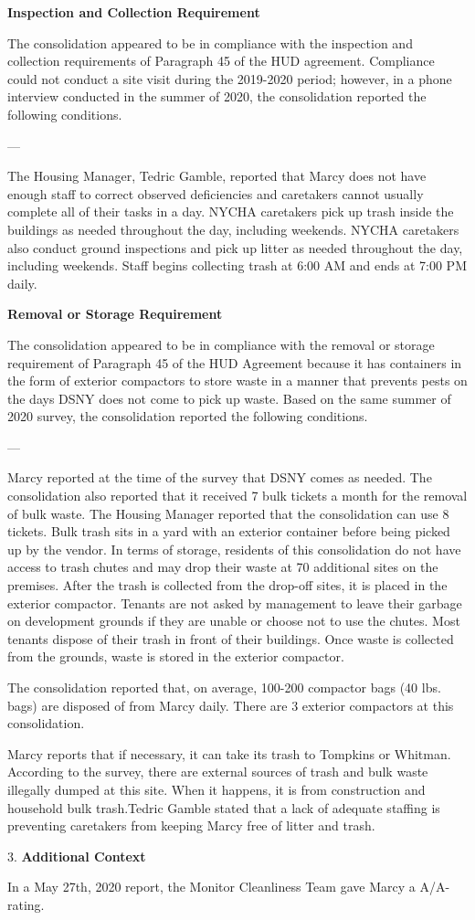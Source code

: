 

\textbf{Inspection and Collection Requirement}

The consolidation appeared to be in compliance with the inspection and collection requirements of Paragraph 45 of the HUD agreement. Compliance could not conduct a site visit during the 2019-2020 period; however, in a phone interview conducted in the summer of 2020, the consolidation reported the following conditions.

---

The Housing Manager, Tedric Gamble, reported that Marcy does not have enough staff to correct observed deficiencies and caretakers cannot usually complete all of their tasks in a day. NYCHA caretakers pick up trash inside the buildings as needed throughout the day, including weekends. NYCHA caretakers also conduct ground inspections and pick up litter as needed throughout the day, including weekends. Staff begins collecting trash at 6:00 AM and ends at 7:00 PM daily.

\textbf{Removal or Storage Requirement}

The consolidation appeared to be in compliance with the  removal or storage requirement of Paragraph  45 of the HUD Agreement because it has containers in the form of exterior compactors to store waste in a manner that prevents pests on the days DSNY does not come to pick up waste. Based on the same summer of  2020 survey, the consolidation reported the following conditions.

---

Marcy reported at the time of the survey that DSNY comes as needed. The consolidation also reported that it received 7 bulk tickets a month for the removal of bulk waste. The Housing Manager reported that the consolidation can use 8 tickets. Bulk trash sits in a yard with an exterior container before being picked up by the vendor. In terms of storage, residents of this consolidation do not have access to trash chutes and may drop their waste at 70 additional sites on the premises. After the trash is collected from the drop-off sites, it is placed in the exterior compactor. Tenants are not asked by management to leave their garbage on development grounds if they are unable or choose not to use the chutes. Most tenants dispose of their trash in front of their buildings. Once waste is collected from the grounds, waste is stored in the exterior compactor. 

The consolidation reported that, on average, 100-200 compactor bags (40 lbs. bags) are disposed of from Marcy daily. There are 3 exterior compactors at this consolidation.

Marcy reports that if necessary, it can take its trash to Tompkins or Whitman. According to the survey, there are external sources of trash and bulk waste illegally dumped at this site. When it happens, it is from construction and household bulk trash.Tedric Gamble stated that a lack of adequate staffing is preventing caretakers from keeping Marcy free of litter and trash. 

3. \textbf{Additional Context} 

In a May 27th, 2020 report, the Monitor Cleanliness Team gave Marcy a A/A- rating. 